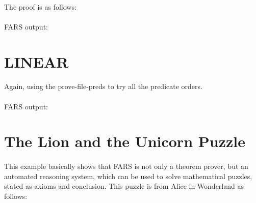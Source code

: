 \documentclass[11pt]{report}
\begin{document}
\paragraph{} The proof is as follows:

\lstset{
xleftmargin=-55pt
}



\paragraph{} FARS output:



\newpage

\section{LINEAR}

\paragraph{} Again, using the prove-file-preds to try all the predicate orders.

\lstset{
xleftmargin=-55pt
}



\paragraph{} FARS output:





\section{The Lion and the Unicorn Puzzle}

\paragraph{} This example basically shows that FARS is not only a theorem prover, but an automated reasoning system, which can be used to solve mathematical puzzles, stated as axioms and conclusion. This puzzle is from Alice in Wonderland as follows:
\end{document}

